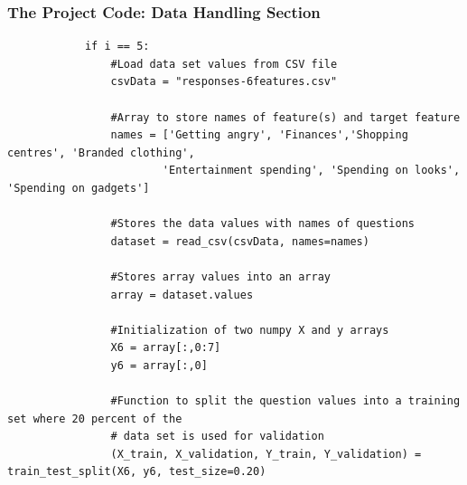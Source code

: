 \documentclass{beamer}
\begin{document}

\begin{frame}[fragile]
\frametitle{The Project Code: Data Handling Section}

\fontsize{6}{5}
\begin{verbatim}
            if i == 5:
                #Load data set values from CSV file
                csvData = "responses-6features.csv"    

                #Array to store names of feature(s) and target feature
                names = ['Getting angry', 'Finances','Shopping centres', 'Branded clothing',
                        'Entertainment spending', 'Spending on looks', 'Spending on gadgets']
    
                #Stores the data values with names of questions
                dataset = read_csv(csvData, names=names)

                #Stores array values into an array
                array = dataset.values

                #Initialization of two numpy X and y arrays
                X6 = array[:,0:7]
                y6 = array[:,0]

                #Function to split the question values into a training set where 20 percent of the 
                # data set is used for validation
                (X_train, X_validation, Y_train, Y_validation) = train_test_split(X6, y6, test_size=0.20)
\end{verbatim}
\end{frame}

\end{document}
